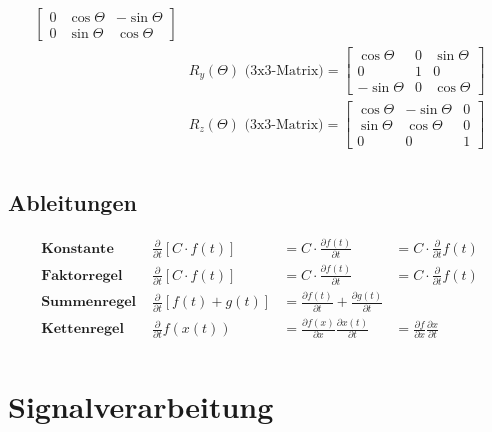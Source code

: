\documentclass[8pt]{article}
\begin{document}
\begin{align*}
\begin{bmatrix}
																											0 & \cos \Theta & -\sin \Theta \\
																											0 & \sin \Theta & \cos \Theta \end{bmatrix}\\
														& \text{$R_y\left(\Theta\right)$ (3x3-Matrix)} = \begin{bmatrix}\cos \Theta & 0 & \sin \Theta \\
																											0 & 1 & 0 \\
																											 -\sin \Theta & 0 & \cos \Theta \end{bmatrix}\\
														& \text{$R_z\left(\Theta\right)$ (3x3-Matrix)} = \begin{bmatrix}\cos \Theta & -\sin \Theta & 0 \\
																											\sin \Theta & \cos \Theta & 0\\
																											0 & 0 & 1 \end{bmatrix}\\
			\end{align*}
		\subsection{Ableitungen}
			\begin{align*}
				\textbf{Konstante } 				& \frac{\partial}{\partial t} [C \cdot f(t)] & = C \cdot \frac{\partial f(t)}{\partial t} & = C \cdot \frac{\partial}{\partial t} f(t)\\
				\textbf{Faktorregel } 				& \frac{\partial}{\partial t} [C \cdot f(t)] & = C \cdot \frac{\partial f(t)}{\partial t} & = C \cdot \frac{\partial}{\partial t} f(t)\\
				\textbf{Summenregel } 				& \frac{\partial}{\partial t} [f(t) + g(t)] & = \frac{\partial f(t)}{\partial t} + \frac{\partial g(t)}{\partial t} \\
				\textbf{Kettenregel } 				& \frac{\partial}{\partial t} f(x(t)) & = \frac{\partial f(x)}{\partial x} \frac{\partial x(t)}{\partial t} & = \frac{\partial f}{\partial x}\frac{\partial x}{\partial t}\\
			\end{align*}
	\section{Signalverarbeitung}
\end{document}
